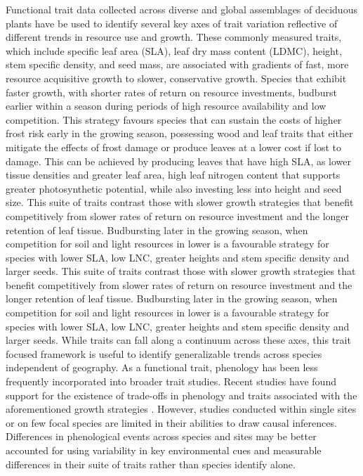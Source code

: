 \documentclass{article}\usepackage[]{graphicx}\usepackage[]{color}
\begin{document}
Functional trait data collected across diverse and global assemblages of deciduous plants have be used to identify several key axes of trait variation reflective of different trends in resource use and growth. These commonly measured traits, which include specific leaf area (SLA), leaf dry mass content (LDMC), height, stem specific density, and seed mass, are associated with gradients of fast, more resource acquisitive growth to slower, conservative growth. Species that exhibit faster growth, with shorter rates of return on resource investments, budburst earlier within a season during periods of high resource availability and low competition. This strategy favours species that can sustain the costs of higher frost risk early in the growing season, possessing wood and leaf traits that either mitigate the effects of frost damage or produce leaves at a lower cost if lost to damage. This can be achieved by producing leaves that have high SLA, as lower tissue densities and greater leaf area, high leaf nitrogen content that supports greater photosynthetic potential, while also investing less into height and seed size. This suite of traits contrast those with slower growth strategies that benefit competitively from slower rates of return on resource investment and the longer retention of leaf tissue. Budbursting later in the growing season, when competition for soil and light resources in lower is a favourable strategy for species with lower SLA, low LNC, greater heights and stem specific density and larger seeds. This suite of traits contrast those with slower growth strategies that benefit competitively from slower rates of return on resource investment and the longer retention of leaf tissue. Budbursting later in the growing season, when competition for soil and light resources in lower is a favourable strategy for species with lower SLA, low LNC, greater heights and stem specific density and larger seeds. While traits can fall along a continuum across these axes, this trait focused framework is useful to identify generalizable trends across species independent of geography. As a functional trait, phenology has been less frequently incorporated into broader trait studies. Recent studies have found support for the existence of trade-offs in phenology and traits associated with the aforementioned growth strategies \citep{citations from Kelly's review}. However, studies conducted within single sites or on few focal species are limited in their abilities to draw causal inferences. Differences in phenological events across species and sites may be better accounted for using variability in key environmental cues and measurable differences in their suite of traits rather than species identify alone. %
\end{document}
